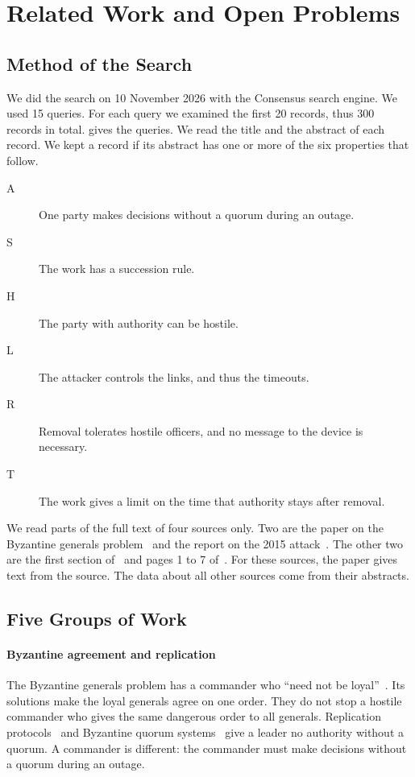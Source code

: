 \section{Related Work and Open Problems}
\label{sec:related}

\subsection{Method of the Search}
\label{sec:search-method}

We did the search on 10 November 2026 with the Consensus search engine.
We used 15 queries. For each query we examined the first 20 records, thus 300 records in
total.  gives the queries. We read the title and the abstract of each
record. We kept a record if its abstract has one or more of the six properties that follow.

\begin{description}
  \item[A] One party makes decisions without a quorum during an outage.
  \item[S] The work has a succession rule.
  \item[H] The party with authority can be hostile.
  \item[L] The attacker controls the links, and thus the timeouts.
  \item[R] Removal tolerates hostile officers, and no message to the device is necessary.
  \item[T] The work gives a limit on the time that authority stays after removal.
\end{description}

We read parts of the full text of four sources only. Two are the paper on the Byzantine
generals problem~\cite{lamport1982byzantine} and the report on the 2015
attack~\cite{eisac2016ukraine}. The other two are the first section
of~\cite{babay2018spire} and pages 1 to 7 of~\cite{bommareddy2024compound}. For these
sources, the paper gives text from the source. The data about all other sources come from
their abstracts. 

\subsection{Five Groups of Work}

\paragraph{Byzantine agreement and replication}
The Byzantine generals problem has a commander who ``need not be
loyal''~\cite[p.~384]{lamport1982byzantine}. Its solutions make the loyal generals agree on
one order. They do not stop a hostile commander who gives the same dangerous order to all
generals. Replication protocols~\cite{castro1999pbft,castro2002pbft,amir2011prime} and
Byzantine quorum systems~\cite{malkhi1998byzquorum} give a leader no authority without a
quorum. A commander is different: the commander must make decisions without a quorum during
an outage.


